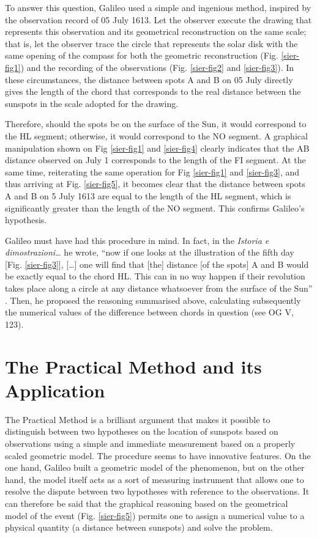 \begin{artengenv}
To answer this question, Galileo used a simple and ingenious method, inspired by the observation record of 05 July 1613.
Let the observer execute the drawing that represents this observation and its geometrical reconstruction on the same
scale; that is, let the observer trace the circle that represents the solar disk with the same opening of the compass
for both the geometric reconstruction (Fig. \ref{sier-fig1}) and the recording of the observations (Fig. \ref{sier-fig2} and \ref{sier-fig3}). In these
circumstances, the distance between spots A and B on 05 July directly gives the length of the chord that corresponds to
the real distance between the sunspots in the scale adopted for the drawing. 

Therefore, should the spots be on the surface of the Sun, it would correspond to the HL segment; otherwise, it would
correspond to the NO segment. A graphical manipulation shown on Fig \ref{sier-fig1} and \ref{sier-fig4} clearly indicates that the AB distance
observed on July 1 corresponds to the length of the FI segment. At the same time, reiterating the same operation for
Fig \ref{sier-fig1} and \ref{sier-fig3}, and thus arriving at Fig. \ref{sier-fig5}, it becomes clear that the distance between spots A and B on 5 July 1613 are
equal to the length of the HL segment, which is significantly greater than the length of the NO segment. This confirms
Galileo’s hypothesis.

Galileo must have had this procedure in mind. In fact, in the \textit{Istoria e dimostrazioni\ldots} he wrote, ``now if one
looks at the illustration of the fifth day [Fig. \ref{sier-fig3}], [\ldots] one will find that [the] distance [of the spots] A and B would
be exactly equal to the chord HL. This can in no way happen if their revolution takes place along a circle at any
distance whatsoever from the surface of the Sun''
\parencite[see OG V, 122.34-36;][p.115]{galilei_sunspots_2010}.
Then, he proposed the reasoning summarised above, calculating subsequently the numerical values of the difference
between chords in question (see OG V, 123).

\section{The Practical Method and its Application}

The Practical Method is a brilliant argument that makes it possible to distinguish between two hypotheses on the
location of sunspots based on observations using a simple and immediate measurement based on a properly scaled
geometric model. The procedure seems to have innovative features. On the one hand, Galileo built a geometric model of
the phenomenon, but on the other hand, the model itself acts as a sort of measuring instrument that allows one to
resolve the dispute between two hypotheses with reference to the observations. It can therefore be said that the
graphical reasoning based on the geometrical model of the event (Fig. \ref{sier-fig5}) permits one to assign a numerical value to a
physical quantity (a distance between sunspots) and solve the problem.


\end{artengenv}
